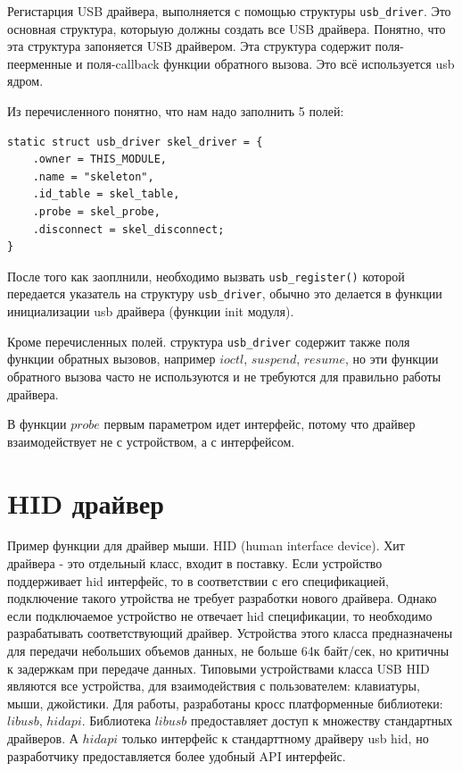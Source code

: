  
 

Регистарция USB драйвера, выполняется с помощью структуры \verb|usb_driver|. Это основная структура, которыую должны создать все USB драйвера. Понятно, что эта структура запоняется USB драйвером. Эта структура содержит поля-пеерменные и поля-callback функции обратного вызова. Это всё используется usb ядром. 

 

Из перечисленного понятно, что нам надо заполнить 5 полей:
\begin{lstlisting}
static struct usb_driver skel_driver = {
	.owner = THIS_MODULE,
	.name = "skeleton",
	.id_table = skel_table,
	.probe = skel_probe,
	.disconnect = skel_disconnect;
}
\end{lstlisting}


После того как заоплнили, необходимо вызвать  \verb|usb_register()|  которой передается указатель на структуру \verb|usb_driver|, обычно это делается в функции инициализации usb драйвера (функции init модуля).

 

Кроме перечисленных полей. структура \verb|usb_driver| содержит также поля функции обратных вызовов, например $ioctl$, $suspend$, $resume$, но эти функции обратного вызова часто не используются и не требуются для правильно работы драйвера.

В функции $probe$ первым параметром идет интерфейс, потому что драйвер взаимодействует не с устройством, а с интерфейсом. 

\section{HID драйвер}

Пример функции для драйвер мыши. HID (human interface device). Хит драйвера -  это отдельный класс, входит в поставку. Если устройство поддерживает hid интерфейс, то  в соответствии с его спецификацией, подключение такого утройства не требует разработки нового  драйвера.  Однако если подключаемое устройство не отвечает hid спецификации, то необходимо разрабатывать соответствующий драйвер. Устройства этого класса предназначены для передачи небольших объемов данных, не больше 64к байт/сек, но критичны к задержкам при передаче данных. Типовыми устройствами класса USB HID являются все устройства, для взаимодействия с пользователем: клавиатуры, мыши, джойстики. Для работы, разработаны кросс платформенные библиотеки: $libusb$, $hidapi$. Библиотека $libusb$ предоставляет доступ к множеству стандартных драйверов. А $hidapi$ только интерфейс к стандарттному драйверу usb hid, но разработчику предоставляется более удобный API интерфейс.

